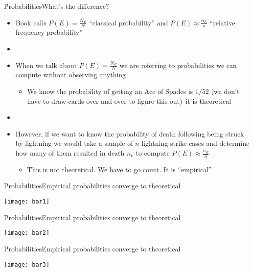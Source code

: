 \documentclass[xcolor=dvipsnames]{beamer}
\begin{document}
\begin{frame}{Probabilities}{What's the difference?}
	\begin{itemize}
		\item Book calls $P(E) = \frac{N_E}{N}$ ``classical probability'' and $P(E) \approx \frac{n_E}{n}$ ``relative frequency probability''
		\item[]
		\item When we talk about $P(E) = \frac{N_E}{N}$ we are referring to probabilities we can compute without observing anything
		\begin{itemize}
			\item  We know the probability of getting an Ace of Spades is $1/52$ (we don't have to draw cards over and over to figure this out)--it is theoretical
		\end{itemize}
	\item[]
	\item However, if we want to know the probability of death following being struck by lightning we would take a sample of $n$ lightning strike cases and determine how many of them resulted in death $n_e$ to compute $P(E) \approx \frac{n_E}{n}$
	\begin{itemize}
		\item This is not theoretical. We have to go count. It is ``empirical''
	\end{itemize}
	\end{itemize}
\end{frame}

\begin{frame}{Probabilities}{Empirical probabilities converge to theoretical}
	\begin{center}
		\texttt{[image: bar1]}
	\end{center}
\end{frame}

\begin{frame}{Probabilities}{Empirical probabilities converge to theoretical}
\begin{center}
	\texttt{[image: bar2]}
\end{center}
\end{frame}

\begin{frame}{Probabilities}{Empirical probabilities converge to theoretical}
\begin{center}
	\texttt{[image: bar3]}
\end{center}
\end{frame}
\end{document}
